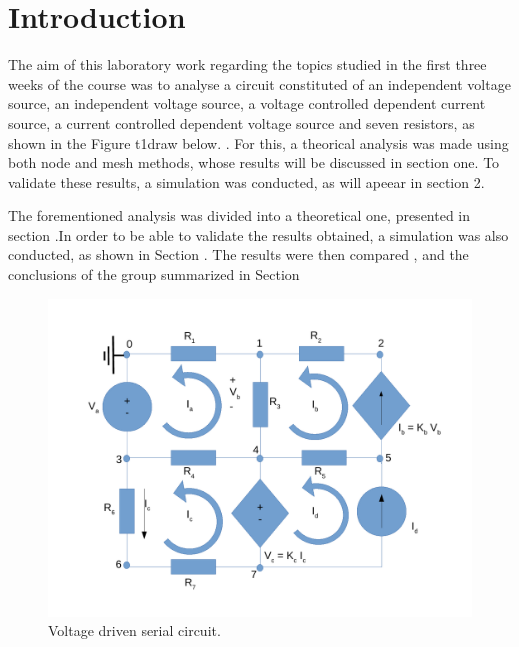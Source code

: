 \section{Introduction}
\label{introduction}

The aim of this laboratory work regarding the topics studied in the first three weeks of the course was to analyse a circuit constituted of an independent voltage source, an independent voltage source, a voltage controlled dependent current source, a current controlled dependent voltage source and seven resistors, as shown in the Figure t1draw below.
. For this, a theorical analysis was made using both node and mesh methods, whose results will be discussed in section one. To validate these results, a simulation was conducted, as will apeear in section 2.


The forementioned analysis was divided into a theoretical one, presented in section .In order to be able to validate the results obtained, a simulation was also conducted, as shown in Section . The results were then compared , and the conclusions of the group summarized in Section 


\begin{figure}[h] \centering
\includegraphics[width=0.4\linewidth]{t1draw.pdf}
\caption{Voltage driven serial circuit.}
\label{t1draw}
\end{figure}

